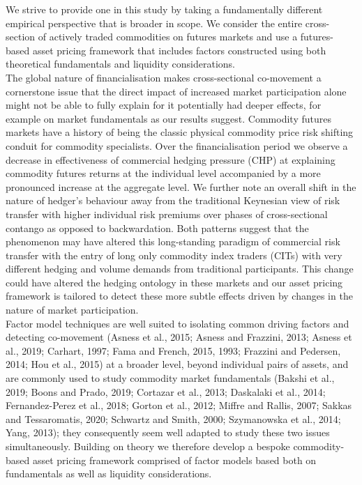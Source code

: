 \documentclass[]{elsarticle} %
\begin{document}
\medskip\setlength{\parindent}{0pt}

We strive to provide one in this study by taking a fundamentally different empirical perspective that is broader in scope. We consider the entire cross-section of actively traded commodities on futures markets and use a futures-based asset pricing framework that includes factors constructed using both theoretical fundamentals and liquidity considerations.\\
The global nature of financialisation makes cross-sectional co-movement a cornerstone issue that the direct impact of increased market participation alone might not be able to fully explain for it potentially had deeper effects, for example on market fundamentals as our results suggest. Commodity futures markets have a history of being the classic physical commodity price risk shifting conduit for commodity specialists. Over the financialisation period we observe a decrease in effectiveness of commercial hedging pressure (CHP) at explaining commodity futures returns at the individual level accompanied by a more pronounced increase at the aggregate level. We further note an overall shift in the nature of hedger's behaviour away from the traditional Keynesian view of risk transfer with higher individual risk premiums over phases of cross-sectional contango as opposed to backwardation. Both patterns suggest that the phenomenon may have altered this long-standing paradigm of commercial risk transfer with the entry of long only commodity index traders (CITs) with very different hedging and volume demands from traditional participants. This change could have altered the hedging ontology in these markets and our asset pricing framework is tailored to detect these more subtle effects driven by changes in the nature of market participation.\\
Factor model techniques are well suited to isolating common driving factors and detecting co-movement (Asness et al., 2015; Asness and Frazzini, 2013; Asness et al., 2019; Carhart, 1997; Fama and French, 2015, 1993; Frazzini and Pedersen, 2014; Hou et al., 2015) at a broader level, beyond individual pairs of assets, and are commonly used to study commodity market fundamentals (Bakshi et al., 2019; Boons and Prado, 2019; Cortazar et al., 2013; Daskalaki et al., 2014; Fernandez-Perez et al., 2018; Gorton et al., 2012; Miffre and Rallis, 2007; Sakkas and Tessaromatis, 2020; Schwartz and Smith, 2000; Szymanowska et al., 2014; Yang, 2013); they consequently seem well adapted to study these two issues simultaneously. Building on theory we therefore develop a bespoke commodity-based asset pricing framework comprised of factor models based both on fundamentals as well as liquidity considerations.\\
\end{document}
